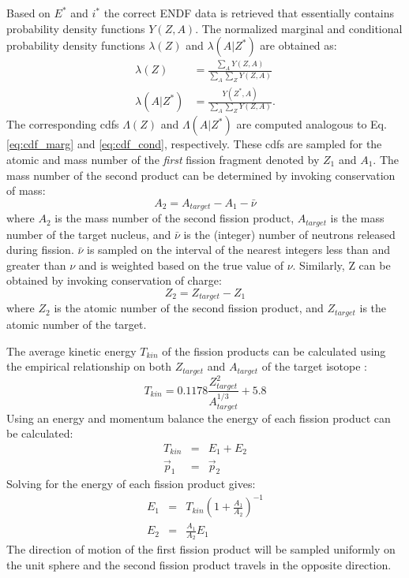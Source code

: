 \documentclass{anstrans}
\begin{document}
Based on $E^*$ and $i^*$ the correct ENDF data is retrieved that essentially contains probability density functions $Y(Z,A)$.
The normalized marginal and conditional probability density functions $\lambda(Z)$ and $\lambda(A | Z^*)$ are obtained as:
\begin{align}
   \lambda(Z) & = \frac{\sum\limits_{A} Y(Z,A)}{\sum\limits_{A}\sum\limits_{Z}  Y(Z,A)} \nonumber \\
  \lambda(A | Z^*)&= \frac{ Y(Z^*, A)}{\sum\limits_{A}\sum\limits_{Z}  Y(Z,A)}.
\end{align}
The corresponding cdfs $\Lambda(Z)$ and $\Lambda(A | Z^*)$ are computed analogous to Eq. \ref{eq:cdf_marg} and \ref{eq:cdf_cond}, respectively. These cdfs are sampled
for the atomic and mass number of the {\em first} fission fragment denoted by $Z_1$ and $A_1$. 
The mass number of the second product can be determined by invoking conservation of mass:
\begin{equation}
  A_{2} = A_{target} - A_{1} - \bar \nu
\end{equation}
where $A_{2}$ is the mass number of the second fission product, $A_{target}$ is the mass number of the target nucleus, and
$\bar \nu$ is the (integer) number of neutrons released during fission. $\bar \nu$ is sampled on the interval of the nearest integers less than and greater than $\nu$ and is weighted based on the true value of $\nu$.
Similarly, Z can be obtained by invoking conservation of charge:
\begin{equation}
  Z_{2} = Z_{target} - Z_{1}
\end{equation}
where $Z_{2}$ is the atomic number of the second fission product, and $Z_{target}$ is the atomic number of the target.

The average kinetic energy $T_{kin}$ of the fission products can be calculated using the empirical relationship
on both $Z_{target}$ and $A_{target}$ of the target isotope \cite{geant}:
\begin{equation}
  T_{kin} = 0.1178 \frac{Z_{target}^2}{A_{target}^{1/3}} + 5.8
\end{equation}
Using an energy and momentum balance the energy of each fission product can be calculated: 
\begin{eqnarray}
  T_{kin} &=& E_{1} + E_{2} \\
  \vec p_{1} &=& \vec p_{2}
\end{eqnarray}
Solving for the energy of each fission product gives:
\begin{eqnarray}
  E_{1} &=& T_{kin}\left(1 +  \frac{A_{1}}{A_{2}}\right)^{-1}\\
  E_{2} &=& \frac{A_{1}}{A_{2}}E_{1}
\end{eqnarray}
The direction of motion of the first fission product will be sampled uniformly on the unit sphere and the second
fission product travels in the opposite direction.
\end{document}
